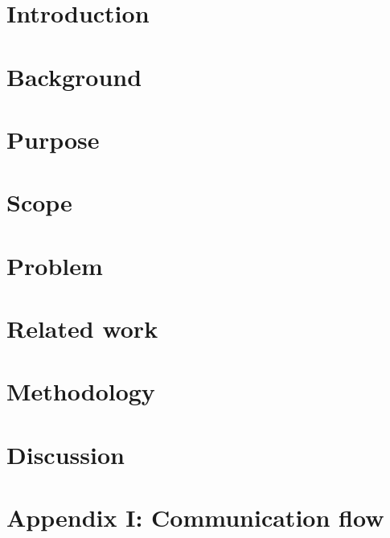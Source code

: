 \documentclass[Report.tex]{subfiles}
\begin{document}
\chapter{Introduction}
	
\chapter{Background}
	

\chapter{Purpose}
	
    
\chapter{Scope}
	

\chapter{Problem}



\chapter{Related work}



\chapter{Methodology}


\chapter{Discussion}


\nocite{*} %
 
\printbibliography%

\chapter*{Appendix I: Communication flow}

\end{document}
